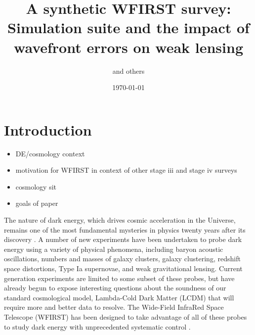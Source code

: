 \documentclass[aps,prd, amsmath,amssymb,superscriptaddress,showkeys,nofootinbib,reprint,preprintnumbers]{revtex4-1}
\begin{document}
\title{A synthetic WFIRST survey: Simulation suite and the impact of wavefront errors on weak lensing}

\author{and others}


\noaffiliation

\date{\today}

\label{firstpage}

\begin{abstract}
\end{abstract}

\keywords{}

\maketitle


\section{Introduction}\label{sec:intro}

\begin{itemize}
\item DE/cosmology context
\item motivation for WFIRST in context of other stage iii and stage iv surveys
\item cosmology sit
\item goals of paper
\end{itemize}


The nature of dark energy, which drives cosmic acceleration in the Universe, remains one of the most fundamental mysteries in physics twenty years after its discovery \cite{}. 
A number of new experiments have been undertaken to probe dark energy using a variety of physical phenomena, including baryon acoustic oscillations, numbers and masses of galaxy clusters, galaxy clustering, redshift space distortions, Type Ia supernovae, and weak gravitational lensing. 
Current generation experiments are limited to some subset of these probes, but have already begun to expose interesting questions about the soundness of our standard cosmological model, Lambda-Cold Dark Matter (LCDM) that will require more and better data to resolve. 
The Wide-Field InfraRed Space Telescope (WFIRST) has been designed to take advantage of all of these probes to study dark energy with unprecedented systematic control \cite{}.
\end{document}
